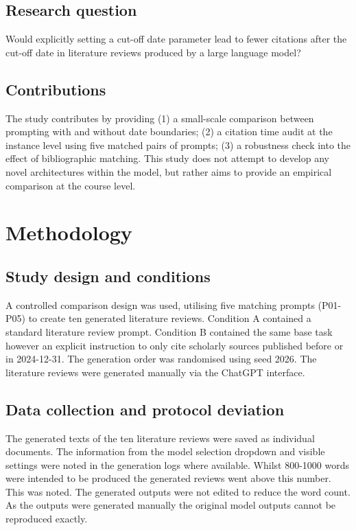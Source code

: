 \documentclass[manuscript]{acmart}
\begin{document}
\subsection{Research question}
Would explicitly setting a cut-off date parameter lead to fewer citations after the cut-off date in literature reviews produced by a large language model?

\subsection{Contributions}
The study contributes by providing (1) a small-scale comparison between prompting with and without date boundaries; (2) a citation time audit at the instance level using five matched pairs of prompts; (3) a robustness check into the effect of bibliographic matching. This study does not attempt to develop any novel architectures within the model, but rather aims to provide an empirical comparison at the course level.

\section{Methodology}
\subsection{Study design and conditions}
A controlled comparison design was used, utilising five matching prompts (P01-P05) to create ten generated literature reviews. Condition A contained a standard literature review prompt. Condition B contained the same base task however an explicit instruction to only cite scholarly sources published before or in 2024-12-31. The generation order was randomised using seed 2026. The literature reviews were generated manually via the ChatGPT interface.

\subsection{Data collection and protocol deviation}
The generated texts of the ten literature reviews were saved as individual documents. The information from the model selection dropdown and visible settings were noted in the generation logs where available. Whilst 800-1000 words were intended to be produced the generated reviews went above this number. This was noted. The generated outputs were not edited to reduce the word count. As the outputs were generated manually the original model outputs cannot be reproduced exactly.
\end{document}
